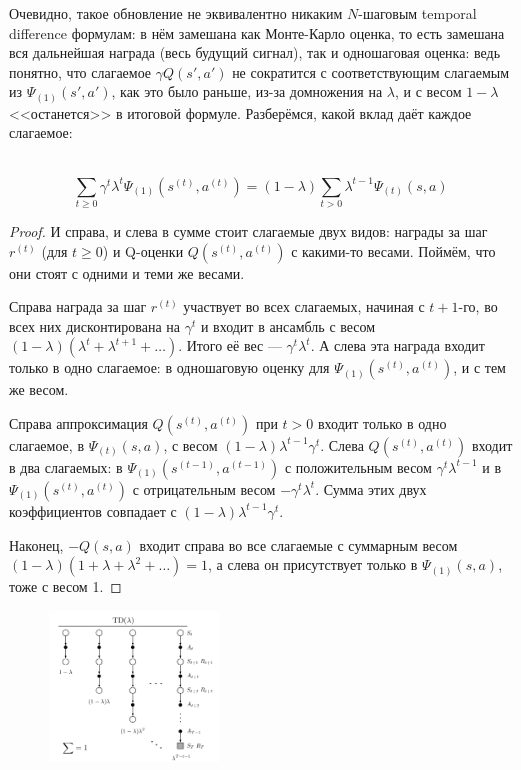 Очевидно, такое обновление не эквивалентно никаким $N$-шаговым temporal difference формулам: в нём замешана как Монте-Карло оценка, то есть замешана вся дальнейшая награда (весь будущий сигнал), так и одношаговая оценка: ведь понятно, что слагаемое $\gamma Q(s', a')$ не сократится с соответствующим слагаемым из $\Psi_{(1)}(s', a')$, как это было раньше, из-за домножения на $\lambda$, и с весом $1 - \lambda$ <<останется>> в итоговой формуле. Разберёмся, какой вклад даёт каждое слагаемое:

\begin{theoremBox}[label=th:tdlambda]{}\,
\begin{equation}\label{TDlambda}
\sum_{t \ge 0} \gamma^t \lambda^t \Psi_{(1)}(s^{(t)}, a^{(t)}) = (1 - \lambda) \sum_{t > 0} \lambda^{t-1} \Psi_{(t)}(s, a)
\end{equation}
\begin{proof} И справа, и слева в сумме стоит слагаемые двух видов: награды за шаг $r^{(t)}$ (для $t \ge 0$) и Q-оценки $Q(s^{(t)}, a^{(t)})$ с какими-то весами. Поймём, что они стоят с одними и теми же весами.

Справа награда за шаг $r^{(t)}$ участвует во всех слагаемых, начиная с $t + 1$-го, во всех них дисконтирована на $\gamma^t$ и входит в ансамбль с весом $(1 - \lambda)(\lambda^t + \lambda^{t+1} + \dots)$. Итого её вес --- $\gamma^t\lambda^t$. А слева эта награда входит только в одно слагаемое: в одношаговую оценку для $\Psi_{(1)}(s^{(t)}, a^{(t)})$, и с тем же весом.

Справа аппроксимация $Q(s^{(t)}, a^{(t)})$ при $t > 0$ входит только в одно слагаемое, в $\Psi_{(t)}(s, a)$, с весом $(1 - \lambda)\lambda^{t - 1}\gamma^t$. Слева $Q(s^{(t)}, a^{(t)})$ входит в два слагаемых: в $\Psi_{(1)}(s^{(t-1)}, a^{(t-1)})$ с положительным весом $\gamma^t\lambda^{t-1}$ и в $\Psi_{(1)}(s^{(t)}, a^{(t)})$ с отрицательным весом $-\gamma^t\lambda^t$. Сумма этих двух коэффициентов совпадает с $(1 - \lambda)\lambda^{t - 1}\gamma^t$.

Наконец, $-Q(s, a)$ входит справа во все слагаемые с суммарным весом $(1 - \lambda)(1 + \lambda + \lambda^2 + \dots) = 1$, а слева он присутствует только в $\Psi_{(1)}(s, a)$, тоже с весом 1.
\end{proof}
\end{theoremBox}

\begin{figure}
\vspace{-0.4cm}
\centering
\includegraphics[width=0.4\textwidth]{Images/td_lambda.png}
\vspace{-0.7cm}
\end{figure}

